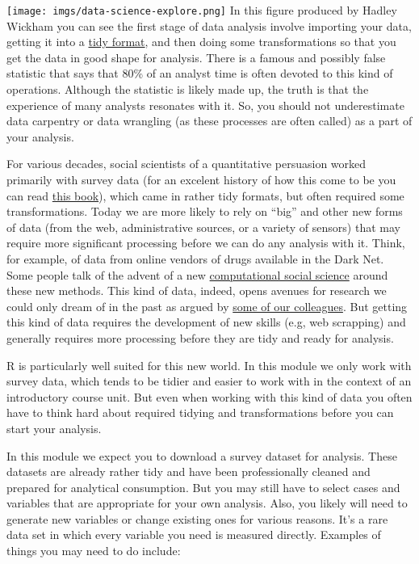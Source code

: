 \documentclass[
]{book}
\begin{document}
\texttt{[image: imgs/data-science-explore.png]}
In this figure produced by Hadley Wickham you can see the first stage of data analysis involve importing your data, getting it into a \href{http://vita.had.co.nz/papers/tidy-data.pdf}{tidy format}, and then doing some transformations so that you get the data in good shape for analysis. There is a famous and possibly false statistic that says that 80\% of an analyst time is often devoted to this kind of operations. Although the statistic is likely made up, the truth is that the experience of many analysts resonates with it. So, you should not underestimate data carpentry or data wrangling (as these processes are often called) as a part of your analysis.

For various decades, social scientists of a quantitative persuasion worked primarily with survey data (for an excelent history of how this come to be you can read \href{https://global.oup.com/academic/product/identities-and-social-change-in-britain-since-1940-9780199587650?cc=gb\&lang=en\&\#}{this book}), which came in rather tidy formats, but often required some transformations. Today we are more likely to rely on ``big'' and other new forms of data (from the web, administrative sources, or a variety of sensors) that may require more significant processing before we can do any analysis with it. Think, for example, of data from online vendors of drugs available in the Dark Net. Some people talk of the advent of a new \href{http://science.sciencemag.org/content/323/5915/721/tab-pdf}{computational social science} around these new methods. This kind of data, indeed, opens avenues for research we could only dream of in the past as argued by \href{https://www.sciencedirect.com/science/article/pii/S0955395919300313?via\%3Dihub}{some of our colleagues}. But getting this kind of data requires the development of new skills (e.g, web scrapping) and generally requires more processing before they are tidy and ready for analysis.

R is particularly well suited for this new world. In this module we only work with survey data, which tends to be tidier and easier to work with in the context of an introductory course unit. But even when working with this kind of data you often have to think hard about required tidying and transformations before you can start your analysis.

In this module we expect you to download a survey dataset for analysis. These datasets are already rather tidy and have been professionally cleaned and prepared for analytical consumption. But you may still have to select cases and variables that are appropriate for your own analysis. Also, you likely will need to generate new variables or change existing ones for various reasons. It's a rare data set in which every variable you need is measured directly. Examples of things you may need to do include:
\end{document}
